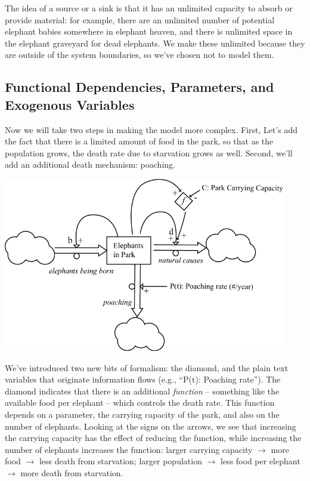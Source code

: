 The idea of a source or a sink is that it has an unlimited capacity to absorb or provide material:  for example, there are an unlimited number of potential elephant babies somewhere in elephant heaven, and there is unlimited space in the elephant graveyard for dead elephants.  We make these unlimited because they are outside of the system boundaries, so we've chosen not to model them.

\subsection{Functional Dependencies, Parameters, and Exogenous Variables}

Now we will take two steps in making the model more complex.  First, Let's add the fact that there is a limited amount of food in the park, so that as the population grows, the death rate due to starvation grows as well.  Second, we'll add an additional death mechanism:  poaching.

\beforefig
\includegraphics[height=3in]{figs/ElephantStockAndFlow2}
\afterfig


We've introduced two new bits of formalism: the diamond, and the plain text variables that originate information flows (e.g., ``P(t): Poaching rate'').  The diamond indicates that there is an additional {\it function} -- something like the available food per elephant --  which controls the death rate.  This function depends on a parameter, the carrying capacity of the park, and also on the number of elephants. Looking at the signs on the arrows, we see that increasing the carrying capacity has the effect of reducing the function, while increasing the number of elephants increases the function:  larger carrying capacity $\rightarrow$ more food $\rightarrow$ less death from starvation; larger population $\rightarrow$ less food per elephant $\rightarrow$ more death from starvation.  

